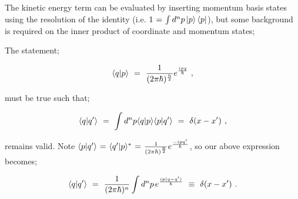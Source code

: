 \documentclass{article}
\begin{document}
The kinetic energy term can be evaluated by inserting momentum basis states using the resolution of the identity (i.e. \begin{math} 1 \hspace{0.025cm} = \hspace{0.025cm} \int d^n p \ket{p} \bra{p} \end{math}), but some background is required on the inner product of coordinate and momentum states;

The statement;

\begin{equation} \label{eb-eq-1-198}
\langle q | p \rangle \hspace{0.125cm} = \hspace{0.125cm} \frac{1}{(2 \pi \hbar)^{\frac{n}{2}}} e^{\frac{i p q}{\hbar}} \hspace{0.125cm} , 
\end{equation}

must be true such that;

\begin{equation} \label{eb-eq-1-199}
\langle q | q' \rangle \hspace{0.125cm} = \hspace{0.125cm} \int d^n p \langle q | p \rangle \langle p | q' \rangle \hspace{0.125cm} = \hspace{0.125cm} \delta ( x - x' )  \hspace{0.125cm} , 
\end{equation}

remains valid. Note \begin{math} \langle p | q' \rangle  \hspace{0.025cm} = \hspace{0.025cm} \langle q' | p \rangle^{*} \hspace{0.025cm} = \hspace{0.025cm} \frac{1}{(2 \pi \hbar)^{\frac{n}{2}}} e^{\frac{- i p q'}{\hbar}}  \end{math}, so our above expression becomes;

\begin{equation} \label{eb-eq-1-200}
\langle q | q' \rangle \hspace{0.125cm} = \hspace{0.125cm} \frac{1}{(2 \pi \hbar)^{n}} \int d^n p \hspace{0.05cm} e^{\frac{i p (q - q')}{\hbar}} \hspace{0.125cm} \equiv \hspace{0.125cm} \delta ( x - x' ) \hspace{0.125cm} .
\end{equation}
\end{document}
